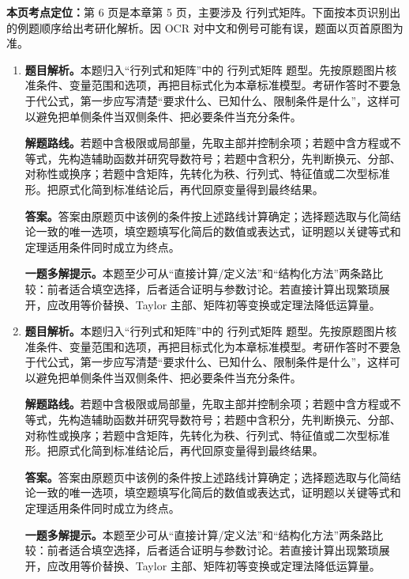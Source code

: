 \begin{solutionblock}
\textbf{本页考点定位：}第 6 页是本章第 5 页，主要涉及 行列式矩阵。下面按本页识别出的例题顺序给出考研化解析。因 OCR 对中文和例号可能有误，题面以页首原图为准。

\begin{enumerate}[label=\textbf{例\arabic*.}, leftmargin=2.4em]

\item \textbf{题目解析。}本题归入“行列式和矩阵”中的 行列式矩阵 题型。先按原题图片核准条件、变量范围和选项，再把目标式化为本章标准模型。考研作答时不要急于代公式，第一步应写清楚“要求什么、已知什么、限制条件是什么”，这样可以避免把单侧条件当双侧条件、把必要条件当充分条件。

\textbf{解题路线。}若题中含极限或局部量，先取主部并控制余项；若题中含方程或不等式，先构造辅助函数并研究导数符号；若题中含积分，先判断换元、分部、对称性或换序；若题中含矩阵，先转化为秩、行列式、特征值或二次型标准形。把原式化简到标准结论后，再代回原变量得到最终结果。

\textbf{答案。}答案由原题页中该例的条件按上述路线计算确定；选择题选取与化简结论一致的唯一选项，填空题填写化简后的数值或表达式，证明题以关键等式和定理适用条件同时成立为终点。

\textbf{一题多解提示。}本题至少可从“直接计算/定义法”和“结构化方法”两条路比较：前者适合填空选择，后者适合证明与参数讨论。若直接计算出现繁琐展开，应改用等价替换、Taylor 主部、矩阵初等变换或定理法降低运算量。

\item \textbf{题目解析。}本题归入“行列式和矩阵”中的 行列式矩阵 题型。先按原题图片核准条件、变量范围和选项，再把目标式化为本章标准模型。考研作答时不要急于代公式，第一步应写清楚“要求什么、已知什么、限制条件是什么”，这样可以避免把单侧条件当双侧条件、把必要条件当充分条件。

\textbf{解题路线。}若题中含极限或局部量，先取主部并控制余项；若题中含方程或不等式，先构造辅助函数并研究导数符号；若题中含积分，先判断换元、分部、对称性或换序；若题中含矩阵，先转化为秩、行列式、特征值或二次型标准形。把原式化简到标准结论后，再代回原变量得到最终结果。

\textbf{答案。}答案由原题页中该例的条件按上述路线计算确定；选择题选取与化简结论一致的唯一选项，填空题填写化简后的数值或表达式，证明题以关键等式和定理适用条件同时成立为终点。

\textbf{一题多解提示。}本题至少可从“直接计算/定义法”和“结构化方法”两条路比较：前者适合填空选择，后者适合证明与参数讨论。若直接计算出现繁琐展开，应改用等价替换、Taylor 主部、矩阵初等变换或定理法降低运算量。

\end{enumerate}
\end{solutionblock}



